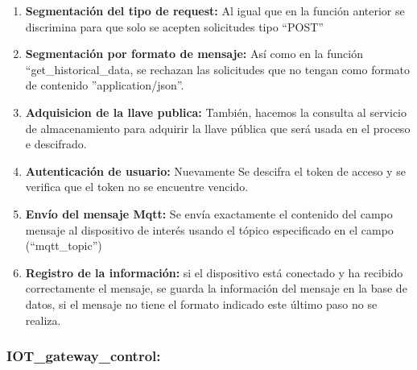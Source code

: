 \begin{enumerate}
	\item \textbf{Segmentación del tipo de request:} Al igual que en la función anterior se discrimina para que solo se acepten solicitudes tipo ``POST''
	\item \textbf{Segmentación por formato de mensaje:} Así como en la función ``get\_historical\_data, se rechazan las solicitudes que no tengan como formato de contenido ''application/json''.
	\item \textbf{Adquisicion de la llave publica:} También, hacemos la consulta al servicio de almacenamiento para adquirir la llave pública que será usada en el proceso e descifrado.
	\item \textbf{Autenticación de usuario:} Nuevamente Se descifra el token de acceso y se verifica que el token no se encuentre vencido.
	\item \textbf{Envío del mensaje Mqtt:} Se envía exactamente el contenido del campo mensaje al dispositivo de interés usando el tópico especificado en el campo (``mqtt\_topic'')
	\item \textbf{Registro de la información:} si el dispositivo está conectado y ha recibido correctamente el mensaje, se guarda la información del mensaje en la base de datos, si el mensaje no tiene el formato indicado este último paso no se realiza.
\end{enumerate}

\subsubsection{IOT\_gateway\_control:}

